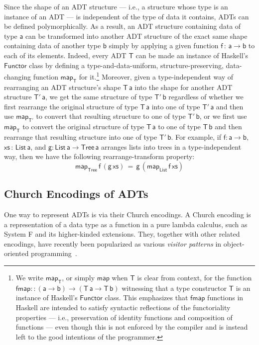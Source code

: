\documentclass[acmsmall,screen,review,anonymous]{acmart}
\theoremstyle{definition}
\begin{document}
Since the shape of an ADT structure --- i.e., a structure whose type
is an instance of an ADT --- is independent of the type of data it
contains, ADTs can be defined polymorphically. As a result, an ADT
structure containing data of type $\mathsf{a}$ can be transformed into
another ADT structure of the exact same shape containing data of
another type $\mathsf{b}$ simply by applying a given function
$\mathsf{f \,:\,a \to b}$ to each of its elements. Indeed, every ADT
$\mathsf{T}$ can be made an instance of Haskell's $\mathsf{Functor}$
class by defining a type-and-data-uniform, structure-preserving,
data-changing function $\mathsf{map_T}$ for it.\footnote{We write
  $\mathsf{map_T}$, or simply $\mathsf{map}$ when $\mathsf{T}$ is
  clear from context, for the function $\mathsf{fmap :: (a \to b) \to
    (T\,a \to T\,b)}$ witnessing that a type constructor $\mathsf{T}$
  is an instance of Haskell's $\mathsf{Functor}$ class. This
  emphasizes that $\mathsf{fmap}$ functions in Haskell are intended to
  satisfy syntactic reflections of the functoriality properties ---
  i.e., preservation of identity functions and composition of
  functions --- even though this is not enforced by the compiler and
  is instead left to the good intentions of the programmer.}
Moreover, given a type-independent way of rearranging an ADT
structure's shape $\mathsf{T\,a}$ into the shape for another ADT
structure $\mathsf{T'\,a}$, we get the same structure of type
$\mathsf{T'\,b}$ regardless of whether we first rearrange the original
structure of type $\mathsf{T\,a}$ into one of type $\mathsf{T'\,a}$
and then use $\mathsf{map_{T'}}$ to convert that resulting structure
to one of type $\mathsf{T'\,b}$, or we first use $\mathsf{map_T}$ to
convert the original structure of type $\mathsf{T\,a}$ to one of type
$\mathsf{T\,b}$ and then rearrange that resulting structure into one
of type $\mathsf{T'\,b}$. For example, if $\mathsf{f : a \to b}$,
$\mathsf{xs \,:\,List\,a}$, and $\mathsf{g : List\,a\to Tree\,a}$
arranges lists into trees in a type-independent way, then we have the
following rearrange-transform property:
\[\mathsf{map_{Tree}\,f\,(g \, xs) \,=\, g\,(map_{List}\,f\,xs)}\]

\subsection{Church Encodings of ADTs}

One way to represent ADTs is via their Church encodings. A Church
encoding is a representation of a data type as a function in a pure
lambda calculus, such as System F and its higher-kinded
extensions. They, together with other related encodings, have recently
been popularized as various {\em visitor patterns} in object-oriented
programming~\cite{owg08,gon21}.
\end{document}
